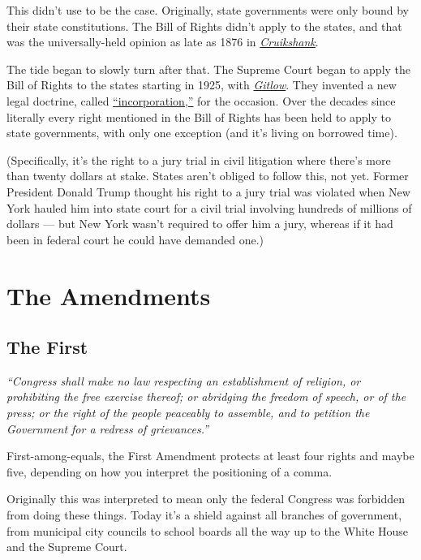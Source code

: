 \documentclass[10pt]{article}
\begin{document}
This didn't use to be the case.  Originally, state governments were only bound by their state constitutions.  The Bill of Rights didn't apply to the states, and that was the universally-held opinion as late as 1876 in \href{https://tile.loc.gov/storage-services/service/ll/usrep/usrep092/usrep092542/usrep092542.pdf}{\it Cruikshank}.

The tide began to slowly turn after that.  The Supreme Court began to apply the Bill of Rights to the states starting in 1925, with \href{https://tile.loc.gov/storage-services/service/ll/usrep/usrep268/usrep268652/usrep268652.pdf}{\it Gitlow}.  They invented a new legal doctrine, called \href{https://tile.loc.gov/storage-services/service/ll/usrep/usrep268/usrep268652/usrep268652.pdf}{``incorporation,''} for the occasion.  Over the decades since literally every right mentioned in the Bill of Rights has been held to apply to state governments, with only one exception (and it's living on borrowed time).

(Specifically, it's the right to a jury trial in civil litigation where there's more than twenty dollars at stake.  States aren't obliged to follow this, not yet.  Former President Donald Trump thought his right to a jury trial was violated when New York hauled him into state court for a civil trial involving hundreds of millions of dollars --- but New York wasn't required to offer him a jury, whereas if it had been in federal court he could have demanded one.)

\section{The Amendments}
\subsection{The First}
\noindent
{\it ``Congress shall make no law respecting an establishment of religion, or prohibiting the free exercise thereof; or abridging the freedom of speech, or of the press; or the right of the people peaceably to assemble, and to petition the Government for a redress of grievances.''}

First-among-equals, the First Amendment protects at least four rights and maybe five, depending on how you interpret the positioning of a comma.

Originally this was interpreted to mean only the federal Congress was forbidden from doing these things.  Today it's a shield against all branches of government, from municipal city councils to school boards all the way up to the White House and the Supreme Court.
\end{document}
